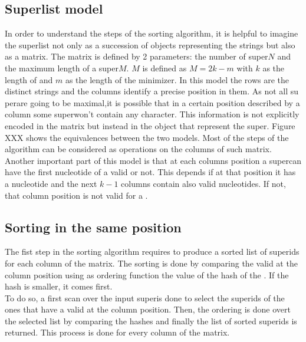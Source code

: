 \subsection{Super\kmer list model}
In order to understand the steps of the sorting algorithm, it is helpful to imagine the super\kmer list not only as a succession of objects representing the strings but also as a matrix. The matrix is defined by 2 parameters: the number of super\kmers $N$ and the maximum length of a super\kmer $M$. $M$ is defined as $M = 2k - m$ with $k$ as the length of \kmer and $m$ as the length of the minimizer. In this model the rows are the distinct strings and the columns identify a precise position in them. As not all su per\kmers are going to be maximal,it is possible that in a certain position described by a column some super\kmer won't contain any character. This information is not explicitly encoded in the matrix but instead in the object that represent the super\kmer. Figure XXX shows the equivalences between the two models. Most of the steps of the algorithm can be considered as operations on the columns of such matrix. Another important part of this model is that at each columns position a super\kmer can have the first nucleotide of a valid \kmer or not. This depends if at that position it has a nucleotide and the next $k-1$ columns contain also valid nucleotides. If not, that column position is not valid for a \kmer. 

\subsection{Sorting \kmers in the same position}
\label{sec:skmersorting}
The fist step in the sorting algorithm requires to produce a sorted list of super\kmer ids for each column of the matrix. The sorting is done by comparing the valid \kmers at the column position using as ordering function the value of the hash of the \kmer. If the hash is smaller, it comes first.\\
To do so, a first scan over the input super\kmer is done to select the super\kmer ids of the ones that have a valid \kmer at the column position. Then, the ordering is done overt the selected list by comparing the \kmer hashes and finally the list of sorted super\kmer ids is returned. This process is done for every column of the matrix.


